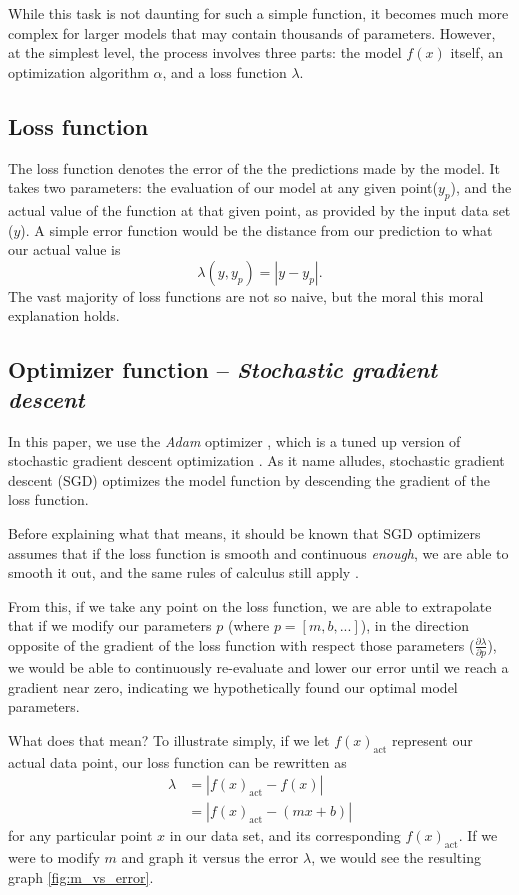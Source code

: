 \documentclass[titlepage,letterpaper]{article}
\begin{document}
While this task is not daunting for such a simple function, it becomes much more complex for larger models that may contain thousands of parameters. However, at the simplest level, the process involves three parts: the model $f(x)$ itself, an optimization algorithm $\alpha$,  and a loss function $\lambda$.


\subsection{Loss function}

The loss function denotes the error of the the predictions made by the model. It takes two parameters: the evaluation of our model at any given point($y_p$), and the actual value of the function at that given point, as provided by the input data set ($y$). A simple error function would be the distance from our prediction to what our actual value is
\[\lambda(y,y_p) =  |y - y_p|. \] The vast majority of loss functions are not so naive, but the moral this moral explanation holds.


\subsection{Optimizer function -- \textit{Stochastic gradient descent}}

In this paper, we use the \textit{Adam} optimizer \cite{adam}, which is a tuned up version of stochastic gradient descent optimization \cite{adam}. As it name alludes, stochastic gradient descent (SGD) optimizes the model function by descending the gradient of the loss function. 

Before explaining what that means, it should be known that SGD optimizers assumes  that if the loss function is smooth and continuous \textit{enough}, we are able to smooth it out, and the same rules of calculus still apply \cite{adam}.

From this, if we take any point on the loss function, we are able to extrapolate that if we modify our parameters \(p\) (where $p = [m, b,...]$), in the direction opposite of the gradient of the loss function with respect those parameters ($\frac{\partial\lambda}{\partial p}$), we would be able to continuously re-evaluate and lower our error until we reach a gradient near zero, indicating we hypothetically found our optimal model parameters.

What does that mean? To illustrate simply, if we let $f(x)_{\text{act}}$ represent our actual data point, our loss function can be rewritten as 
\begin{align}
\lambda &=  |f(x)_{\text{act}} - f(x)| \nonumber\\
&= | f(x)_{\text{act}} -  (mx + b)\label{eq1}|
\end{align}
for any particular point $x$ in our data set, and its corresponding $f(x)_{\text{act}}$. If we were to modify  $m$  and graph it versus the error $\lambda$, we would see the resulting graph \cref{fig:m_vs_error}. 
\end{document}
